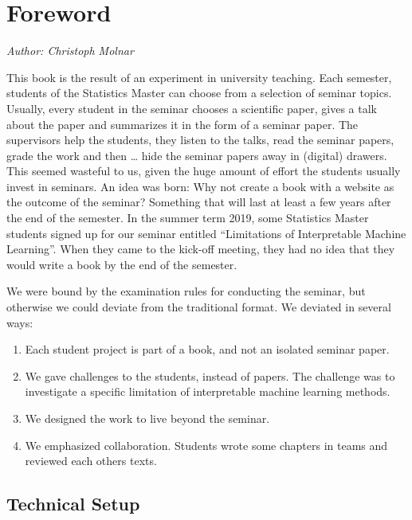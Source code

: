 \documentclass[
]{krantz}
\providecommand{\tightlist}{%
  \setlength{\itemsep}{0pt}\setlength{\parskip}{0pt}}
\begin{document}
\mainmatter

\chapter*{Foreword}\label{foreword}


\emph{Author: Christoph Molnar}

This book is the result of an experiment in university teaching.
Each semester, students of the Statistics Master can choose from a selection of seminar topics.
Usually, every student in the seminar chooses a scientific paper, gives a talk about the paper and summarizes it in the form of a seminar paper.
The supervisors help the students, they listen to the talks, read the seminar papers, grade the work and then \ldots{} hide the seminar papers away in (digital) drawers.
This seemed wasteful to us, given the huge amount of effort the students usually invest in seminars.
An idea was born:
Why not create a book with a website as the outcome of the seminar?
Something that will last at least a few years after the end of the semester.
In the summer term 2019, some Statistics Master students signed up for our seminar entitled ``Limitations of Interpretable Machine Learning''.
When they came to the kick-off meeting, they had no idea that they would write a book by the end of the semester.

We were bound by the examination rules for conducting the seminar, but otherwise we could deviate from the traditional format.
We deviated in several ways:

\begin{enumerate}
\def\labelenumi{\arabic{enumi}.}
\tightlist
\item
  Each student project is part of a book, and not an isolated seminar paper.
\item
  We gave challenges to the students, instead of papers. The challenge was to investigate a specific limitation of interpretable machine learning methods.
\item
  We designed the work to live beyond the seminar.
\item
  We emphasized collaboration. Students wrote some chapters in teams and reviewed each others texts.
\end{enumerate}

\section*{Technical Setup}\label{technical-setup}
\end{document}
